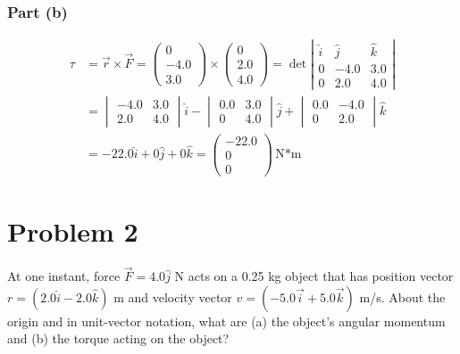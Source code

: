 \documentclass[12pt]{article}
\begin{document}
\subsubsection{Part (b)}
\begin{align}
    \tau    &=  \vec{r}\times\vec{F}
        =   \left(\begin{matrix} 0 \\ -4.0 \\ 3.0 \end{matrix}\right) \times \left(\begin{matrix} 0 \\ 2.0 \\ 4.0 \end{matrix}\right)
        =   \det\left|\begin{matrix}
            \hat{i}&\hat{j}&\hat{k}\\
            0   &   -4.0    &   3.0\\
            0   &   2.0     &   4.0
        \end{matrix}\right|\\
        &=  \begin{vmatrix} -4.0 & 3.0 \\ 2.0 & 4.0 \end{vmatrix}\hat{i} - 
            \begin{vmatrix} 0.0 & 3.0 \\ 0 & 4.0 \end{vmatrix}\hat{j} +
            \begin{vmatrix} 0.0 & -4.0 \\ 0 & 2.0 \end{vmatrix}\hat{k}\\
        &=  -22.0\hat{i} + 0\hat{j} + 0\hat{k}
        =   \boxed{\begin{pmatrix}-22.0\\0\\0\end{pmatrix}\unit{\newton*\meter}}
\end{align}

\pagebreak
\section{Problem 2}
At one instant, force $\vec{F} = 4.0 \hat{j}$ N acts on a 0.25 kg object that has position vector $r = (2.0\hat{i} - 2.0\hat{k})$ m and velocity vector $v = (-5.0\vec{i} + 5.0\vec{k})$ m/s. About the origin and in unit-vector notation, what are (a) the object's angular momentum and (b) the torque acting on the object?
\end{document}
